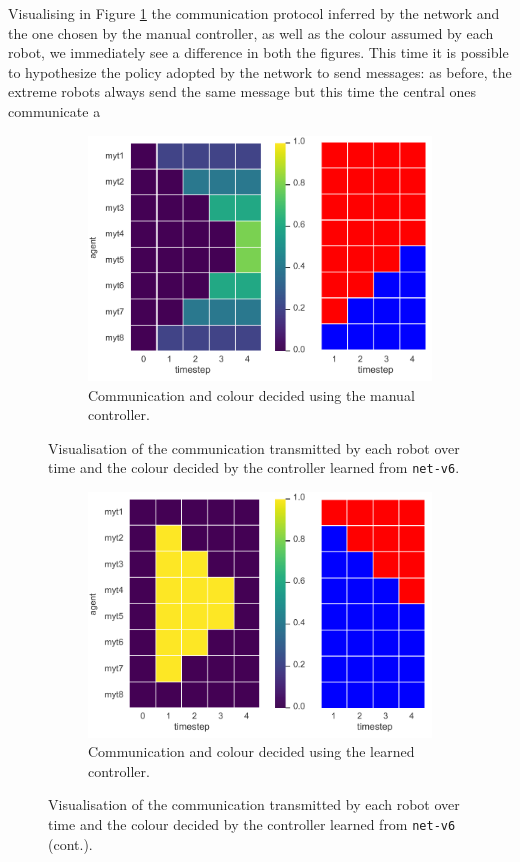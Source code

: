 Visualising in Figure \ref{fig:net-v6commcolour} the communication protocol 
inferred by the network and the one chosen by the manual controller, as well as 
the colour assumed by each robot, we immediately see a difference in both the 
figures.
This time it is possible to hypothesize the policy adopted by the network to send 
messages: as before, the extreme robots always send the same message but this 
time the central ones communicate a  
\begin{figure}[!htb]
	\begin{subfigure}[h]{\textwidth}
		\centering
		\includegraphics[width=.55\textwidth]{contents/images/net-v6/net-v6-manual-0}
		\caption{Communication and colour decided using the manual controller.}
	\end{subfigure}
	\caption[Evaluation of the communication learned by 
	\texttt{net-v6}.]{Visualisation of the communication transmitted by each 
	robot over time and the colour decided by the controller learned from 
	\texttt{net-v6}.}	
\end{figure}
\begin{figure}[!htb]\ContinuedFloat
	\hspace*{\fill}%
	\vspace*{8pt}%
	\hspace*{\fill}%
	\begin{subfigure}[h]{\textwidth}
		\centering			
		\includegraphics[width=.55\textwidth]{contents/images/net-v6/net-v6-learned-0}
		\caption{Communication and colour decided using the learned controller.}
	\end{subfigure}
	\caption[]{Visualisation of the communication transmitted by each 
		robot over time and the colour decided by the controller learned from 
		\texttt{net-v6} (cont.).}	
	\label{fig:net-v6commcolour}
\end{figure}

